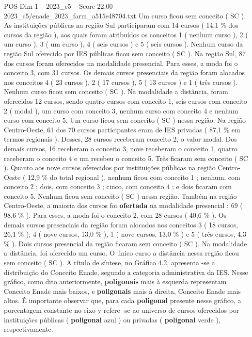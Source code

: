 \begin{textsample}{POS Dim 1 – 2023\_c5 – Score 22.00 – 2023\_c5/enade\_2023\_farm\_a515e48704.txt}
Um curso ficou sem conceito ( SC ).
As instituições públicas na região Sul participaram com 14 cursos ( 14,1 \% dos cursos da região ), aos quais foram atribuídos os conceitos 1 ( nenhum curso ), 2 ( um curso ), 3 ( um curso ), 4 ( seis cursos ) e 5 ( seis cursos ).
Nenhum curso da região Sul oferecido por IES públicas ficou sem conceito ( SC ).
Na região Sul, 87 dos cursos foram oferecidos na modalidade presencial.
Para esses, a moda foi o conceito 3, com 31 cursos.
Os demais cursos presenciais da região foram alocados nos conceitos 4 ( 23 cursos ), 2 ( 17 cursos ), 5 ( 13 cursos ) e 1 ( três cursos ).
Nenhum curso ficou sem conceito ( SC ).
Na modalidade a distância, foram oferecidos 12 cursos, sendo quatro cursos com conceito 1, seis cursos com conceito 2 ( modal ), um curso com conceito 3, nenhum curso com conceito 4 e nenhum curso com conceito 5.
Um curso ficou sem conceito ( SC ) nessa região.
Na região Centro-Oeste, 61 dos 70 cursos participantes eram de IES privadas ( 87,1 \% em termos regionais ).
Desses, 28 cursos receberam conceito 2, o valor modal.
Dos demais cursos, 16 receberam o conceito 3, nove receberam o conceito 1, quatro receberam o conceito 4 e um recebeu o conceito 5.
Três ficaram sem conceito ( SC ).
Quanto aos nove cursos oferecidos por instituições públicas na região Centro-Oeste ( 12,9 \% do total regional ), nenhum ficou com conceito 1 ; nenhum, com conceito 2 ; dois, com conceito 3 ; cinco, com conceito 4 ; e dois ficaram com conceito 5.
Nenhum ficou sem conceito ( SC ) nessa região.
Também na região Centro-Oeste, a maioria dos cursos foi \textbf{ofertada} na modalidade presencial : 69 ( 98,6 \% ).
Para esses, a moda foi o conceito 2, com 28 cursos ( 40,6 \% ).
Os demais cursos presenciais da região foram alocados nos conceitos 3 ( 18 cursos, 26,1 \% ), 4 ( nove cursos, 13,0 \% ), 1 ( nove cursos, 13,0 \% ) e 5 ( três cursos, 4,3 \% ).
Dois cursos presencial da região ficaram sem conceito ( SC ).
Na modalidade a distância, foi oferecido um curso.
O único curso a distância nessa região ficou sem conceito ( SC ).
A título de síntese, no Gráfico 4.2, apresenta -se a distribuição do Conceito Enade, segundo a categoria administrativa da IES.
Nesse gráfico, como dito anteriormente, \textbf{poligonais} mais à esquerda representam Conceito Enade mais baixos, e \textbf{poligonais} mais à direita, Conceito Enade mais altos.
É importante observar que, para cada \textbf{poligonal} presente nesse gráfico, a porcentagem constante no eixo y refere -se ao universo de cursos oferecidos por instituições públicas ( \textbf{poligonal} azul ) ou privadas ( \textbf{poligonal} verde ), respectivamente.

\end{textsample}
